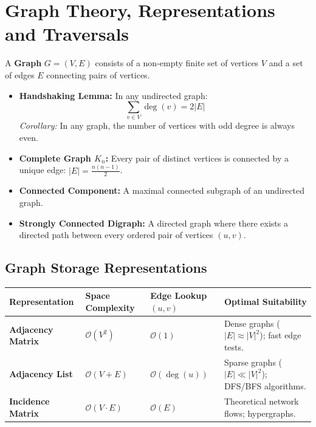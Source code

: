 \documentclass[12pt,a4paper]{article}
\renewcommand{\arraystretch}{1.45}
\begin{document}
\section{Graph Theory, Representations and Traversals}

\begin{tcolorbox}[defbox, title={\textbf{Definition: Graph Data Structure and Core Terminologies}}]
A \textbf{Graph} $G = (V, E)$ consists of a non-empty finite set of vertices $V$ and a set of edges $E$ connecting pairs of vertices.
\begin{itemize}[leftmargin=*, itemsep=2pt]
  \item \textbf{Handshaking Lemma:} In any undirected graph:
  \begin{equation}
    \sum_{v \in V} \deg(v) = 2 |E|
  \end{equation}
  \textit{Corollary:} In any graph, the number of vertices with odd degree is always even.
  \item \textbf{Complete Graph $K_n$:} Every pair of distinct vertices is connected by a unique edge: $|E| = \frac{n(n-1)}{2}$.
  \item \textbf{Connected Component:} A maximal connected subgraph of an undirected graph.
  \item \textbf{Strongly Connected Digraph:} A directed graph where there exists a directed path between every ordered pair of vertices $(u, v)$.
\end{itemize}
\end{tcolorbox}

\subsection{Graph Storage Representations}
\par\vspace{4pt}\noindent
\begingroup
\setlength{\tabcolsep}{4.5pt}
\setlength{\extrarowheight}{3pt}
\renewcommand{\arraystretch}{1.3}
\begin{tabularx}{\linewidth}{|B{3.2cm}|B{2.8cm}|B{3.0cm}|Y|}
\hline
\textbf{Representation} & \textbf{Space Complexity} & \textbf{Edge Lookup $(u, v)$} & \textbf{Optimal Suitability} \\
\hline
\textbf{Adjacency Matrix} & $\mathcal{O}(V^2)$ & $\mathcal{O}(1)$ & Dense graphs ($|E| \approx |V|^2$); fast edge tests. \\
\hline
\textbf{Adjacency List} & $\mathcal{O}(V + E)$ & $\mathcal{O}(\deg(u))$ & Sparse graphs ($|E| \ll |V|^2$); DFS/BFS algorithms. \\
\hline
\textbf{Incidence Matrix} & $\mathcal{O}(V \cdot E)$ & $\mathcal{O}(E)$ & Theoretical network flows; hypergraphs. \\
\hline
\end{tabularx}
\endgroup
\end{document}

